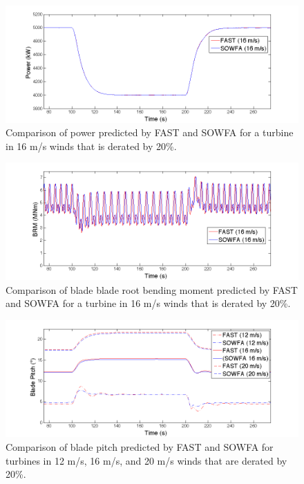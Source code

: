 \begin{figure}[ht]	
	\centering
		\includegraphics[width = .95\linewidth]{Figures/ch6Figures/fig6-3.png}
	\caption{Comparison of power predicted by FAST and SOWFA for a turbine in 16 m/s winds that is derated by 20\%.}
	\label{fig6-3}
\end{figure}

\begin{figure}[ht]	
	\centering
		\includegraphics[width = .95\linewidth]{Figures/ch6Figures/fig6-5.png}

	\caption{Comparison of blade blade root bending moment predicted by FAST and SOWFA for a turbine in 16 m/s winds that is derated by 20\%.}
	\label{fig6-5}
\end{figure}

\begin{figure}[ht]	
	\centering
		\includegraphics[width = .95\linewidth]{Figures/ch6Figures/fig6-4.png}

	\caption{Comparison of blade pitch predicted by FAST and SOWFA for turbines in 12 m/s, 16 m/s, and 20 m/s  winds that are derated by 20\%.}
	\label{fig6-4}
\end{figure}



